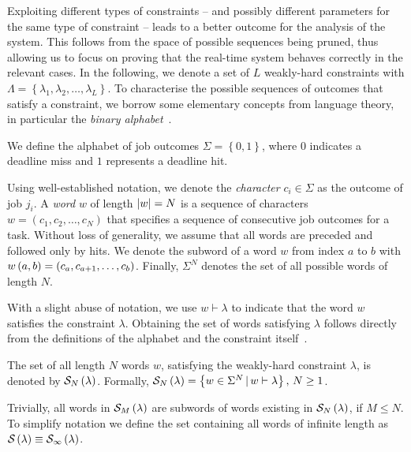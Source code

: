 Exploiting different types of constraints -- and possibly different parameters for the same type of constraint -- leads to a better outcome for the analysis of the system. 
This follows from the space of possible sequences being pruned, thus allowing us to focus on proving that the real-time system behaves correctly in the relevant cases. 
In the following, we denote a set of $L$ weakly-hard constraints with $\Lambda = \left\{ \lambda_1, \lambda_2, \ldots, \lambda_L \right\} $. 
To characterise the possible sequences of outcomes that satisfy a constraint, we borrow some elementary concepts from language theory, in particular the \emph{binary alphabet}~\cite{Hopcroft:2006}.
%
\begin{definition}%
\label{def:alphabet}%
    We define the alphabet of job outcomes $\Sigma = \left\{ 0, 1 \right\}$, where $0$ indicates a deadline miss and $1$ represents a deadline hit.
\end{definition}
%
Using well-established notation, we denote the \emph{character} $c_i \in \Sigma$ as the outcome of job $j_i$.
A \emph{word} $w$ of length $\left|w\right| = N$ is a sequence of characters $w = \left( c_1, c_2, \ldots, c_N \right)$ that specifies a sequence of consecutive job outcomes for a task.
Without loss of generality, we assume that all words are preceded and followed only by hits.
We denote the subword of a word $w$ from index $a$ to $b$ with $w\left( a, b \right) = \left( c_a, c_{a+1}, \ldots, c_b \right)$.
Finally, $\Sigma^N$ denotes the set of all possible words of length $N$.

With a slight abuse of notation, we use $w \vdash \lambda$ to indicate that the word $w$ satisfies the constraint $\lambda$.
Obtaining the set of words satisfying $\lambda$ follows directly from the definitions of the alphabet and the constraint itself~\cite{Bernat:2001, Bernat:1998}.
%
\begin{definition}%
    \label{def:satisfaction-set}%
    The set of all length $N$ words $w$, satisfying the weakly-hard constraint $\lambda$, is denoted by $\mathcal{S}_{N}\left( \lambda \right)$.
    Formally, $\mathcal{S}_{N}\left( \lambda \right) = \left\{ w \in \Sigma^N \, | \, w \vdash \lambda \right\},\, N \geq 1$.
\end{definition}
%
Trivially, all words in $\mathcal{S}_{M}\left( \lambda \right)$ are subwords of words existing in $\mathcal{S}_{N}\left( \lambda \right)$, if $M \leq N$.
To simplify notation we define the set containing all words of infinite length as $\mathcal{S}_{}\left( \lambda \right) \equiv \mathcal{S}_{\infty}\left( \lambda \right)$.

